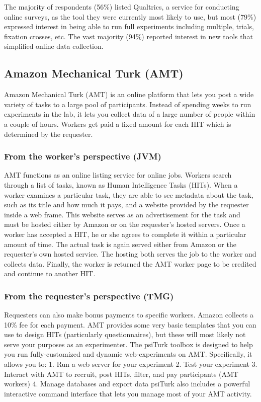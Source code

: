 \documentclass[twocolumn]{svjour3}          %
\begin{document}
The majority of respondents (56\%) listed Qualtrics, a service for conducting online surveys, as the tool they
were currently most likely to use, but most (79\%) expressed interest in being able to run full
experiments including multiple, trials, fixation crosses, etc. The vast majority (94\%) reported
interest in new tools that simplified online data collection.


\subsection{Amazon Mechanical Turk (AMT)} 

Amazon Mechanical Turk (AMT) is an online platform that lets you post a wide variety of tasks to a large pool of participants.
Instead of spending weeks to run experiments in the lab, it lets you collect data of a large number of people within a couple of hours.
Workers get paid a fixed amount for each HIT which is determined by the requester.

\subsubsection{From the worker's perspective (JVM)}
AMT functions as an online listing service for online jobs.
Workers search through a list of tasks, known as Human Intelligence Tasks (HITs). 
When a worker examines a particular task, they are able to see metadata about the task, such as its title and how much it pays, and a website provided by the requester inside a web frame.
This website serves as an advertisement for the task and must be hosted either by Amazon or on the requester's hosted servers.
Once a worker has accepted a HIT, he or she agrees to complete it within a particular amount of time.
The actual task is again served either from Amazon or the requester's own hosted service.
The hosting both serves the job to the worker and collects data.
Finally, the worker is returned the AMT worker page to be credited and continue to another HIT.

\subsubsection{From the requester's perspective (TMG)}
Requesters can also make bonus payments to specific workers. Amazon collects a 10\% fee for each payment.
AMT provides some very basic templates that you can use to design HITs (particularly questionnaires), but these will most likely not serve your purposes as an experimenter.
The psiTurk toolbox is designed to help you run fully-customized and dynamic web-experiments on AMT.
Specifically, it allows you to:
1. Run a web server for your experiment
2. Test your experiment
3. Interact with AMT to recruit, post HITs, filter, and pay participants (AMT workers)
4. Manage databases and export data
psiTurk also includes a powerful interactive command interface that lets you manage most of your AMT activity.
\end{document}
